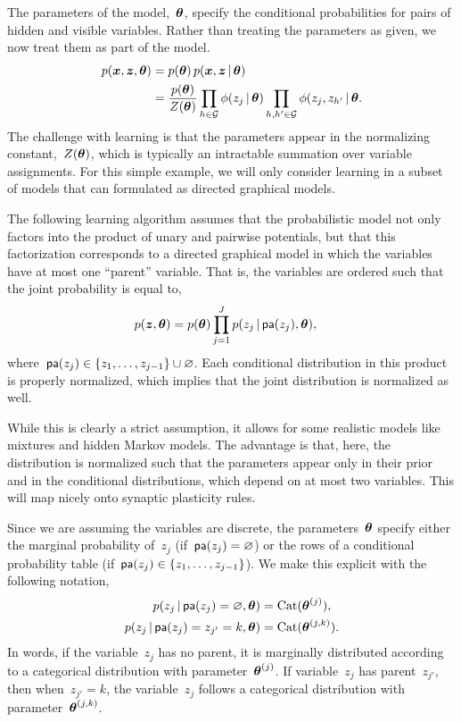 The parameters of the model,~$\boldsymbol{\theta}$, specify the conditional
probabilities for pairs of hidden and visible variables. Rather than
treating the parameters as given, we now treat them as part of the
model.
\begin{align*}
  p(\boldsymbol{x}, \boldsymbol{z}, \boldsymbol{\theta}) &= p(\boldsymbol{\theta}) \, p(\boldsymbol{x}, \boldsymbol{z} \,|\, \boldsymbol{\theta})  \\
  &= \frac{p(\boldsymbol{\theta})}{Z(\boldsymbol{\theta})} \prod_{h \in \mathcal{G}} \phi(z_j \,|\, \boldsymbol{\theta}) \prod_{h,h' \in \mathcal{G}} \phi(z_j, z_{h'} \,|\, \boldsymbol{\theta}.
\end{align*}
The challenge with learning is that the parameters appear in the
normalizing constant,~$Z(\boldsymbol{\theta})$, which is typically an intractable
summation over variable assignments. For this simple example,
we will only consider learning in a subset of models that can
formulated as directed graphical models.

\begin{assumption}
  The following learning algorithm assumes that the probabilistic
  model not only factors into the product of unary and pairwise
  potentials, but that this factorization corresponds to a directed
  graphical model in which the variables have at most one ``parent''
  variable. That is, the variables are ordered such that the
  joint probability is equal to,
  \begin{align*}
    p(\boldsymbol{z}, \boldsymbol{\theta}) &= p(\boldsymbol{\theta}) \prod_{j=1}^J p(z_j \,|\, \mathsf{pa}(z_j), \boldsymbol{\theta}),
  \end{align*}
  where~$\mathsf{pa}(z_j) \in \{z_1, \ldots, z_{j-1}\} \cup \varnothing$.
  Each conditional distribution in this product is properly normalized,
  which implies that the joint distribution is normalized as well.
\end{assumption}

While this is clearly a strict assumption, it allows
for some realistic models like mixtures and hidden Markov models.
The advantage is that, here, the
distribution is normalized such that the parameters appear only
in their prior and in the conditional distributions, which depend
on at most two variables. This will map nicely onto synaptic plasticity
rules. 

Since we are assuming the variables
are discrete, the parameters~$\boldsymbol{\theta}$ specify either the marginal
probability of~$z_j$ (if~$\mathsf{pa}(z_j)=\varnothing$) or the rows of a
conditional probability table (if~$\mathsf{pa}(z_j) \in \{z_1, \ldots, z_{j-1}\}$).
We
make this explicit with the following notation,
\begin{align*}
  p(z_j \,|\, \mathsf{pa}(z_j)=\varnothing, \boldsymbol{\theta}) &= \mathrm{Cat}(\boldsymbol{\theta}^{(j)}), \\
  p(z_j \,|\, \mathsf{pa}(z_{j})=z_{j'}=k, \boldsymbol{\theta}) &=  \mathrm{Cat}(\boldsymbol{\theta}^{(j,k)}).
\end{align*}
In words, if the variable~$z_j$ has no parent, it is marginally distributed
according to a categorical distribution with parameter~$\boldsymbol{\theta}^{(j)}$.
If variable~$z_j$ has parent~$z_{j'}$, then when~$z_{j'}=k$, the
variable~$z_j$ follows a categorical distribution with
parameter~$\boldsymbol{\theta}^{(j,k)}$. 


